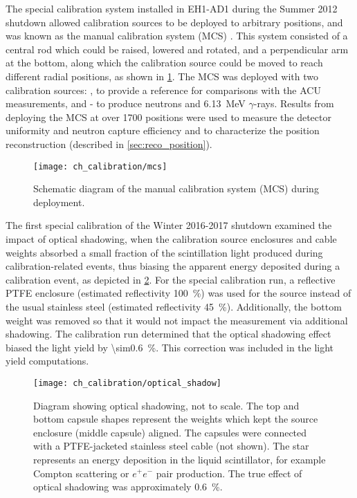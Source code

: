 The special calibration system installed in EH1-AD1 during the Summer 2012 shutdown
allowed calibration sources to be deployed to arbitrary positions,
and was known as the manual calibration system (MCS) \cite{mcs}.
This system consisted of a central rod which could be raised, lowered and rotated,
and a perpendicular arm at the bottom, along which the calibration source
could be moved to reach different radial positions,
as shown in \cref{fig:mcs}.
The MCS was deployed with two calibration sources:
, to provide a reference for comparisons with the ACU measurements,
and - to produce neutrons
and \SI{6.13}{\MeV} $\gamma$-rays.
Results from deploying the MCS at over 1700 positions were used
to measure the detector uniformity \cite{mcs_uniformity}
and neutron capture efficiency \cite{mcs_eff}
and to characterize the position reconstruction (described in \cref{sec:reco_position}).

\begin{figure}
    \centering
    \texttt{[image: ch\_calibration/mcs]}
    \caption[Manual calibration system]{
        Schematic diagram of the manual calibration system (MCS) during deployment.
    }
    \label{fig:mcs}
\end{figure}

The first special calibration of the Winter 2016-2017 shutdown
examined the impact of optical shadowing,
when the calibration source enclosures and cable weights
absorbed a small fraction of the scintillation light
produced during calibration-related events,
thus biasing the apparent energy deposited during a calibration event,
as depicted in \cref{fig:optical_shadowing}.
For the special calibration run,
a reflective PTFE enclosure (estimated reflectivity \SI{100}{\percent})
was used for the  source
instead of the usual stainless steel (estimated reflectivity \SI{45}{\percent}).
Additionally, the bottom weight was removed
so that it would not impact the measurement via additional shadowing.
The calibration run determined that
the optical shadowing effect biased the light yield by \SI{\sim0.6}{\percent}.
This correction was included in the light yield computations.

\begin{figure}
    \centering
    \texttt{[image: ch\_calibration/optical\_shadow]}
    \caption[Optical shadowing diagram]{
        Diagram showing optical shadowing, not to scale.
        The top and bottom capsule shapes represent the weights
        which kept the source enclosure (middle capsule) aligned.
        The capsules were connected with a PTFE-jacketed stainless steel cable (not shown).
        The star represents an energy deposition in the liquid scintillator,
        for example Compton scattering or $e^+e^-$ pair production.
        The true effect of optical shadowing was approximately \SI{0.6}{\percent}.
    }
    \label{fig:optical_shadowing}
\end{figure}

